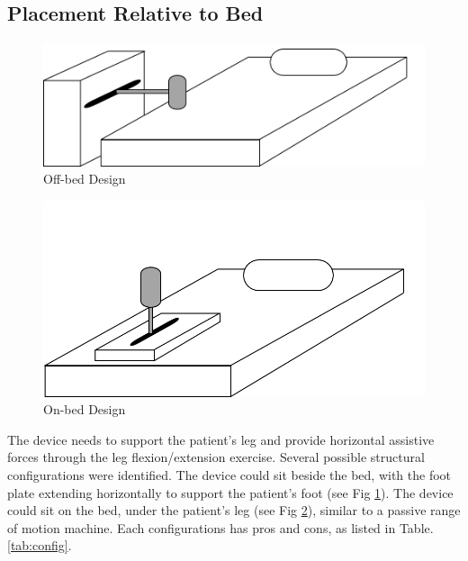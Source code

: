 \documentclass[12pt]{report}
\begin{document}
		
		\subsection{Placement Relative to Bed}
		
			
	\begin{figure}[t] 
		\centering
		\includegraphics[width=0.75\linewidth]{off-bed}
		\caption{Off-bed Design}
		\label{fig:off-bed}
	\end{figure}	
	
	
		
	\begin{figure}[t] 
		\centering
		\includegraphics[width=0.75\linewidth]{on-bed}
		\caption{On-bed Design}
		\label{fig:on-bed}
	\end{figure}	
	
		
		The device needs to support the patient's leg and provide horizontal assistive forces through the leg flexion/extension exercise. Several possible structural configurations were identified. The device could sit beside the bed, with the foot plate extending horizontally to support the patient's foot (see Fig \ref{fig:off-bed}). The device could sit on the bed, under the patient's leg (see Fig \ref{fig:on-bed}), similar to a passive range of motion machine. Each configurations has pros and cons, as listed in Table. \ref{tab:config}.
\end{document}
